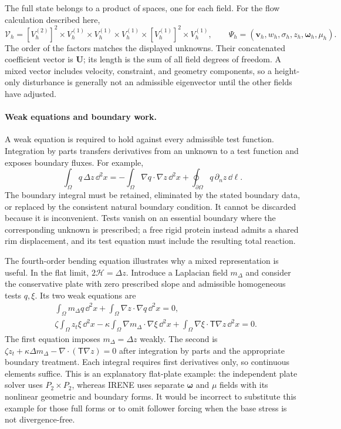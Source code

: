 The full state belongs to a product of spaces, one for each field. For the flow calculation described here,
\begin{equation}
\mathcal V_h=[V_h^{(2)}]^2\times V_h^{(1)}\times V_h^{(1)}
\times V_h^{(1)}\times[V_h^{(1)}]^2\times V_h^{(1)},
\qquad \Psi_h=(\bm v_h,w_h,\sigma_h,z_h,\bm\omega_h,\mu_h).
\end{equation}
The order of the factors matches the displayed unknowns. Their concatenated coefficient vector is $\bm U$; its length is the sum of all field degrees of freedom. A mixed vector includes velocity, constraint, and geometry components, so a height-only disturbance is generally not an admissible eigenvector until the other fields have adjusted.

\paragraph{Weak equations and boundary work.}
A weak equation is required to hold against every admissible test function. Integration by parts transfers derivatives from an unknown to a test function and exposes boundary fluxes. For example,
\begin{equation}
\int_\Omega q\,\Delta z\,\dd^2x
=-\int_\Omega\nabla q\cdot\nabla z\,\dd^2x
+\oint_{\partial\Omega}q\,\partial_nz\,\dd\ell.
\label{eq:fem-parts}
\end{equation}
The boundary integral must be retained, eliminated by the stated boundary data, or replaced by the consistent natural boundary condition. It cannot be discarded because it is inconvenient. Tests vanish on an essential boundary where the corresponding unknown is prescribed; a free rigid protein instead admits a shared rim displacement, and its test equation must include the resulting total reaction.

The fourth-order bending equation illustrates why a mixed representation is useful. In the flat limit, $2\mathcal H=\Delta z$. Introduce a Laplacian field $m_\Delta$ and consider the conservative plate with zero prescribed slope and admissible homogeneous tests $q,\xi$. Its two weak equations are
\begin{align}
&\int_\Omega m_\Delta q\,\dd^2x+
\int_\Omega\nabla z\cdot\nabla q\,\dd^2x=0,\\
&\zeta\int_\Omega z_t\xi\,\dd^2x
-\kappa\int_\Omega\nabla m_\Delta\cdot\nabla\xi\,\dd^2x
+\int_\Omega\nabla\xi\cdot\mathsf T\nabla z\,\dd^2x=0.
\label{eq:fem-mixed-plate}
\end{align}
The first equation imposes $m_\Delta=\Delta z$ weakly. The second is $\zeta z_t+\kappa\Delta m_\Delta-\nabla\cdot(\mathsf T\nabla z)=0$ after integration by parts and the appropriate boundary treatment. Each integral requires first derivatives only, so continuous elements suffice. This is an explanatory flat-plate example: the independent plate solver uses $P_2\times P_2$, whereas IRENE uses separate $\bm\omega$ and $\mu$ fields with its nonlinear geometric and boundary forms. It would be incorrect to substitute this example for those full forms or to omit follower forcing when the base stress is not divergence-free.

